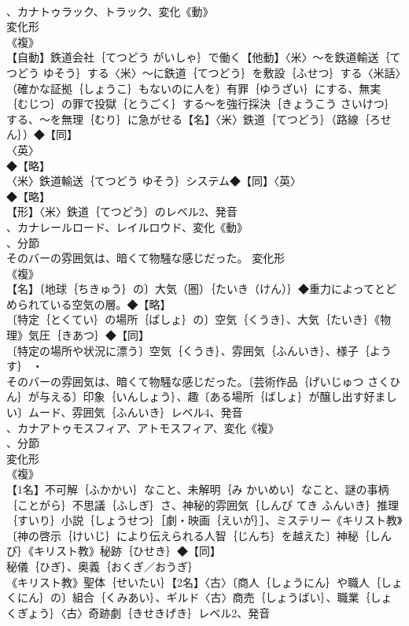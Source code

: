 \documentclass[8pt]{extreport}
\begin{document}
\begin{CJK}{UTF8}{min}
\\	、カナトゥラック、トラック、変化《動》
\\	変化形 
\\	《複》
\\	【自動】鉄道会社｛てつどう がいしゃ｝で働く【他動】〈米〉～を鉄道輸送｛てつどう ゆそう｝する〈米〉～に鉄道｛てつどう｝を敷設｛ふせつ｝する〈米話〉（確かな証拠｛しょうこ｝もないのに人を）有罪｛ゆうざい｝にする、無実｛むじつ｝の罪で投獄｛とうごく｝する～を強行採決｛きょうこう さいけつ｝する、～を無理｛むり｝に急がせる【名】〈米〉鉄道｛てつどう｝（路線｛ろせん｝）◆【同】
\\	〈英〉
\\	◆【略】
\\	〈米〉鉄道輸送｛てつどう ゆそう｝システム◆【同】〈英〉
\\	◆【略】
\\	【形】〈米〉鉄道｛てつどう｝のレベル2、発音
\\	、カナレールロード、レイルロウド、変化《動》
\\	、分節
\\	そのバーの雰囲気は、暗くて物騒な感じだった。	変化形 
\\	《複》
\\	【名】〔地球｛ちきゅう｝の〕大気（圏）｛たいき（けん）｝◆重力によってとどめられている空気の層。◆【略】
\\	〔特定｛とくてい｝の場所｛ばしょ｝の〕空気｛くうき｝、大気｛たいき｝《物理》気圧｛きあつ｝◆【同】
\\	〔特定の場所や状況に漂う〕空気｛くうき｝、雰囲気｛ふんいき｝、様子｛ようす｝ ・
\\	そのバーの雰囲気は、暗くて物騒な感じだった。〔芸術作品｛げいじゅつ さくひん｝が与える〕印象｛いんしょう｝、趣〔ある場所｛ばしょ｝が醸し出す好ましい〕ムード、雰囲気｛ふんいき｝レベル4、発音
\\	、カナアトゥモスフィア、アトモスフィア、変化《複》
\\	、分節
\\	変化形 
\\	《複》
\\	【1名】不可解｛ふかかい｝なこと、未解明｛み かいめい｝なこと、謎の事柄｛ことがら｝不思議｛ふしぎ｝さ、神秘的雰囲気｛しんぴ てき ふんいき｝推理｛すいり｝小説｛しょうせつ｝［劇・映画｛えいが｝］、ミステリー《キリスト教》〔神の啓示｛けいじ｝により伝えられる人智｛じんち｝を越えた〕神秘｛しんぴ｝《キリスト教》秘跡｛ひせき｝◆【同】
\\	秘儀｛ひぎ｝、奥義｛おくぎ／おうぎ｝
\\	《キリスト教》聖体｛せいたい｝【2名】〈古〉〔商人｛しょうにん｝や職人｛しょくにん｝の〕組合｛くみあい｝、ギルド〈古〉商売｛しょうばい｝、職業｛しょくぎょう｝〈古〉奇跡劇｛きせきげき｝レベル2、発音

\end{CJK}
\end{document}
